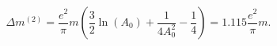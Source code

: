 \begin{equation}
\label{eq15}
\Delta m^{(2)} = \frac{e^2}\pi m \left(
\frac 32\ln(A_0)+\frac 1{4A_0^2}-\frac 14\right)=
1.115\frac{e^2}\pi m.
\end{equation}

